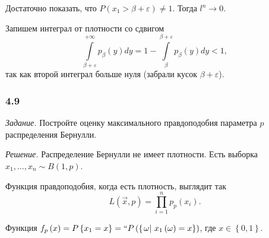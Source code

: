 Достаточно показать, что $P \left( x_1 > \beta + \varepsilon \right) \neq 1$.
Тогда $l^n \to 0$.

Запишем интеграл от плотности со сдвигом
$$ \int \limits_{ \beta + \varepsilon }^{+ \infty } p_{ \beta } \left( y \right) dy =
  1 - \int \limits_{ \beta }^{ \beta + \varepsilon } p_{ \beta } \left( y \right) dy <
  1,$$
так как второй интеграл больше нуля (забрали кусок $ \beta + \varepsilon $).

\subsubsection*{4.9}

\textit{Задание.} Постройте оценку максимального правдоподобия параметра $p$ распределения Бернулли.

\textit{Решение.} Распределение Бернулли не имеет плотности.
Есть выборка $x_1, \dotsc, x_n \sim B \left( 1, p \right) $.

Функция правдоподобия, когда есть плотность, выглядит так
$$L \left( \vec{x}, p \right) =
  \prod \limits_{i = 1}^n p_p \left( x_i \right).$$

Функция
$f_p \left( x \right) =
  P \left\{ x_1 = x \right\} =``
  P \left( \left\{ \left. \omega \right| \, x_1 \left( \omega \right) = x \right\} \right) $,
где $x \in \left\{ 0, 1 \right\} $.

